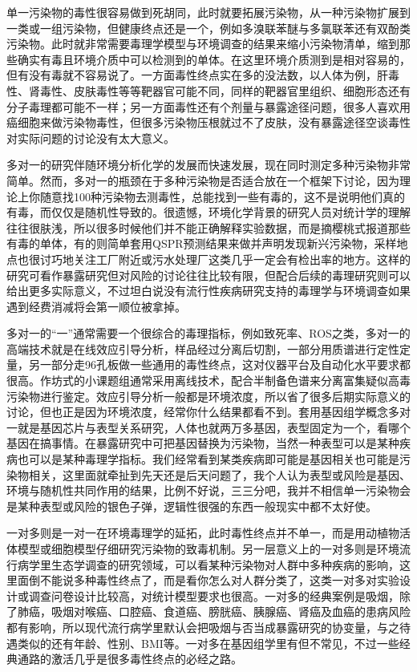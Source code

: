 \documentclass[]{book}
\begin{document}
单一污染物的毒性很容易做到死胡同，此时就要拓展污染物，从一种污染物扩展到一类或一组污染物，但健康终点还是一个，例如多溴联苯醚与多氯联苯还有双酚类污染物。此时就非常需要毒理学模型与环境调查的结果来缩小污染物清单，缩到那些确实有毒且环境介质中可以检测到的单体。在这里环境介质测到是相对容易的，但有没有毒就不容易说了。一方面毒性终点实在多的没法数，以人体为例，肝毒性、肾毒性、皮肤毒性等等靶器官可能不同，同样的靶器官里组织、细胞形态还有分子毒理都可能不一样；另一方面毒性还有个剂量与暴露途径问题，很多人喜欢用癌细胞来做污染物毒性，但很多污染物压根就过不了皮肤，没有暴露途径空谈毒性对实际问题的讨论没有太大意义。

多对一的研究伴随环境分析化学的发展而快速发展，现在同时测定多种污染物非常简单。然而，多对一的瓶颈在于多种污染物是否适合放在一个框架下讨论，因为理论上你随意找100种污染物去测毒性，总能找到一些有毒的，这不是说明他们真的有毒，而仅仅是随机性导致的。很遗憾，环境化学背景的研究人员对统计学的理解往往很肤浅，所以很多时候他们并不能正确解释实验数据，而是摘樱桃式报道那些有毒的单体，有的则简单套用QSPR预测结果来做并声明发现新兴污染物，采样地点也很讨巧地关注工厂附近或污水处理厂这类几乎一定会有检出率的地方。这样的研究可看作暴露研究但对风险的讨论往往比较有限，但配合后续的毒理研究则可以给出更多实际意义，不过坦白说没有流行性疾病研究支持的毒理学与环境调查如果遇到经费消减将会第一顺位被拿掉。

多对一的``一''通常需要一个很综合的毒理指标，例如致死率、ROS之类，多对一的高端技术就是在线效应引导分析，样品经过分离后切割，一部分用质谱进行定性定量，另一部分走96孔板做一些通用的毒性终点，这对仪器平台及自动化水平要求都很高。作坊式的小课题组通常采用离线技术，配合半制备色谱来分离富集疑似高毒污染物进行鉴定。效应引导分析一般都是环境浓度，所以省了很多后期实际意义的讨论，但也正是因为环境浓度，经常你什么结果都看不到。套用基因组学概念多对一就是基因芯片与表型关系研究，人体也就两万多基因，表型固定为一个，看哪个基因在搞事情。在暴露研究中可把基因替换为污染物，当然一种表型可以是某种疾病也可以是某种毒理学指标。我们经常看到某类疾病即可能是基因相关也可能是污染物相关，这里面就牵扯到先天还是后天问题了，我个人认为表型或风险是基因、环境与随机性共同作用的结果，比例不好说，三三分吧，我并不相信单一污染物会是某种表型或风险的银色子弹，逻辑性很强的东西一般现实中都不太好使。

一对多则是一对一在环境毒理学的延拓，此时毒性终点并不单一，而是用动植物活体模型或细胞模型仔细研究污染物的致毒机制。另一层意义上的一对多则是环境流行病学里生态学调查的研究领域，可以看某种污染物对人群中多种疾病的影响，这里面倒不能说多种毒性终点了，而是看你怎么对人群分类了，这类一对多对实验设计或调查问卷设计比较高，对统计模型要求也很高。一对多的经典案例是吸烟，除了肺癌，吸烟对喉癌、口腔癌、食道癌、膀胱癌、胰腺癌、肾癌及血癌的患病风险都有影响，所以现代流行病学里默认会把吸烟与否当成暴露研究的协变量，与之待遇类似的还有年龄、性别、BMI等。一对多在基因组学里有但不常见，不过一些经典通路的激活几乎是很多毒性终点的必经之路。
\end{document}
